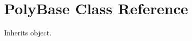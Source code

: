 \hypertarget{classpyneb_1_1utils_1_1polyutils_1_1_poly_base}{\section{Poly\-Base Class Reference}
\label{classpyneb_1_1utils_1_1polyutils_1_1_poly_base}
}


Inherits object.

